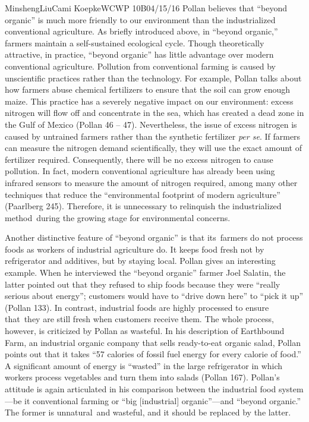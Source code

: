 \documentclass[12pt,letterpaper]{article}
\begin{document}
\begin{mla}{Minsheng}{Liu}{Cami Koepke}{WCWP 10B}{04/15/16}
Pollan believes that ``beyond organic'' is much more friendly to our
environment than the industrialized conventional agriculture. As briefly
introduced above, in ``beyond organic,'' farmers maintain a
self-sustained ecological cycle. Though theoretically attractive, in
practice, ``beyond organic'' has little advantage over modern
conventional agriculture. Pollution from conventional farming is caused
by unscientific practices rather than the technology. For example,
Pollan talks about how farmers abuse chemical fertilizers to ensure that
the soil can grow enough maize. This practice has a severely negative
impact on our environment: excess nitrogen will flow off and concentrate
in the sea, which has created a dead zone in the Gulf of Mexico (Pollan
46 -- 47). Nevertheless, the issue of excess nitrogen is caused by
untrained farmers rather than the synthetic fertilizer \emph{per se}. If
farmers can measure the nitrogen demand scientifically, they will use
the exact amount of fertilizer required. Consequently, there will be no
excess nitrogen to cause pollution. In fact, modern conventional
agriculture has already been using infrared sensors to measure the
amount of nitrogen required, among many other techniques that reduce the
``environmental footprint of modern agriculture'' (Paarlberg 245).
Therefore, it is unnecessary to relinquish the industrialized
method~during the growing stage for environmental concerns.

Another distinctive feature of ``beyond organic'' is that its~farmers do
not process foods as workers of industrial agriculture do. It keeps food
fresh not by refrigerator and additives, but by staying local. Pollan
gives an interesting example. When he interviewed the ``beyond organic''
farmer Joel Salatin, the latter pointed out that they refused to ship
foods because they were ``really serious about energy''; customers would
have to ``drive down here'' to ``pick it up'' (Pollan 133). In contrast,
industrial foods are highly processed to ensure that~they are still
fresh when customers receive them. The whole process, however, is
criticized by Pollan as wasteful. In his description of Earthbound Farm,
an industrial organic company that sells ready-to-eat organic salad,
Pollan points out that it takes ``57 calories of fossil fuel energy for
every calorie of food.'' A significant amount of energy is ``wasted'' in
the large refrigerator in which workers process vegetables and turn them
into salads (Pollan 167). Pollan's attitude is again articulated in his
comparison between the industrial food system---be it conventional
farming or ``big {[}industrial{]} organic''---and ``beyond organic.''
The former is unnatural~and wasteful, and it should be replaced by the
latter.


\end{mla}
\end{document}
